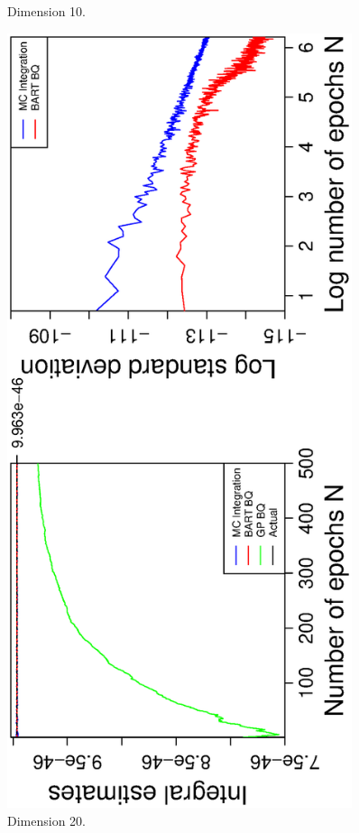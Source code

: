 \begin{figure}[H]
\begin{minipage}[b]{0.4\textwidth}
     \vspace{-1cm}
     \caption{Dimension 10.}
  \end{minipage}
    \hspace{1.5cm}
  \begin{minipage}[b]{0.4\textwidth}
    \includegraphics[width= 0.9\textwidth, angle = -90]{report/Figures/6/convergenceMean620Dimensions.eps}
    \vspace{-1cm}
    \caption{Dimension 20.}
  \end{minipage}
\end{figure}

